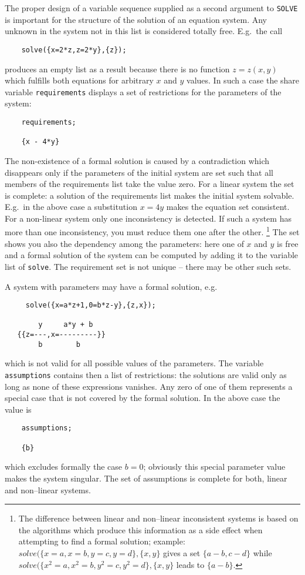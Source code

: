 The proper design of a variable sequence
supplied as a second argument to {\tt SOLVE} is important
for the structure of the solution of an equation system.
Any unknown in the system
not in this list is considered totally free. E.g.\  the call
\begin{verbatim}
    solve({x=2*z,z=2*y},{z});
\end{verbatim}
produces an empty list as a result because there is no function
$z=z(x,y)$ which fulfills both equations for arbitrary $x$ and $y$ values.
In such a case the share variable {\tt requirements}
displays a set of restrictions for the parameters of the system:
\begin{verbatim}
    requirements;

    {x - 4*y}
\end{verbatim}
The non-existence of a formal solution is caused by a 
contradiction which disappears only if the parameters
of the initial system are set such that all members
of the requirements list take the value zero.
For a linear system the set is complete: a solution
of the requirements list makes the initial
system solvable. E.g.\  in the above case a substitution
$x=4y$ makes the equation set consistent. For a non-linear
system only one inconsistency is detected. If such a system
has more than one inconsistency, you must reduce them
one after the other. 
\footnote{
The difference between linear and non--linear
inconsistent systems is based on the algorithms which
produce this information as a side effect when attempting
to find a formal solution; example:
$solve(\{x=a,x=b,y=c,y=d\},\{x,y\}$ gives a set $\{a-b,c-d\}$
while $solve(\{x^2=a,x^2=b,y^2=c,y^2=d\},\{x,y\}$ leads to $\{a-b\}$.
}
The  set shows you also the dependency among the parameters: here
one of $x$ and $y$ is free and a formal solution of the system can be
computed by adding it to the variable list of {\tt solve}. 
The requirement set is not unique -- there may be other such sets.


A system  with parameters may have a formal solution, e.g.\
\begin{verbatim}
     solve({x=a*z+1,0=b*z-y},{z,x});

        y     a*y + b
   {{z=---,x=---------}}
        b        b
\end{verbatim}
which is not valid for all possible values of the parameters.
The variable {\tt assumptions} contains then a list of
restrictions: the solutions are valid only as long
as none of these expressions vanishes. Any zero of one of them
represents a special case that is not covered by the
formal solution. In the above case the value is
\extendedmanual{\newpage}
\begin{verbatim}
    assumptions;

    {b}
\end{verbatim}
which excludes formally the case $b=0$; obviously this special 
parameter value makes the system singular. The set of assumptions
is complete for both, linear and non--linear systems.
    

